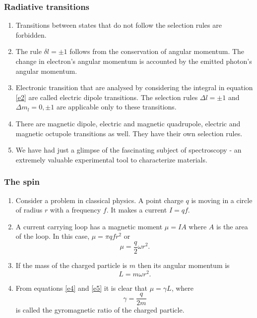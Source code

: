 \documentclass{beamer}
\begin{document}
\begin{frame}
\frametitle{Radiative transitions}
\begin{enumerate}
\item Transitions between states that do not follow the selection rules are 
forbidden.
\item The rule $\delta l = \pm 1$ follows from the conservation of angular
momentum. The change in electron's angular momentum is accounted by the
emitted photon's angular momentum.
\item Electronic transition that are analysed by considering the integral in
equation \eqref{e2} are called electric dipole transitions. The selection rules
$\Delta l = \pm 1$ and $\Delta m_l = 0, \pm 1$ are applicable only to these 
transitions.
\item There are magnetic dipole, electric and magnetic quadrupole, electric
and magnetic octupole transitions as well. They have their own selection rules.
\item We have had just a glimpse of the fascinating subject of spectroscopy - an
extremely valuable experimental tool to characterize materials.
\end{enumerate}
\end{frame}

\begin{frame}
\frametitle{The spin}
\begin{enumerate}
\item Consider a problem in classical physics. A point charge $q$ is moving in a
circle of radius $r$ with a frequency $f$. It makes a current $I = qf$.
\item A current carrying loop has a magnetic moment $\mu = IA$ where $A$ is the
area of the loop. In this case, $\mu = \pi qfr^2$ or
\begin{equation}\label{e4}
\mu = \frac{q}{2}\omega r^2.
\end{equation}
\item If the mass of the charged particle is $m$ then its angular momentum is
\begin{equation}\label{e5}
L = m\omega r^2.
\end{equation}
\item From equations \eqref{e4} and \eqref{e5} it is clear that $\mu=\gamma L$,
where
\begin{equation}\label{e6}
\gamma = \frac{q}{2m}
\end{equation}
is called the gyromagnetic ratio of the charged particle.
\end{enumerate}
\end{frame}
\end{document}
